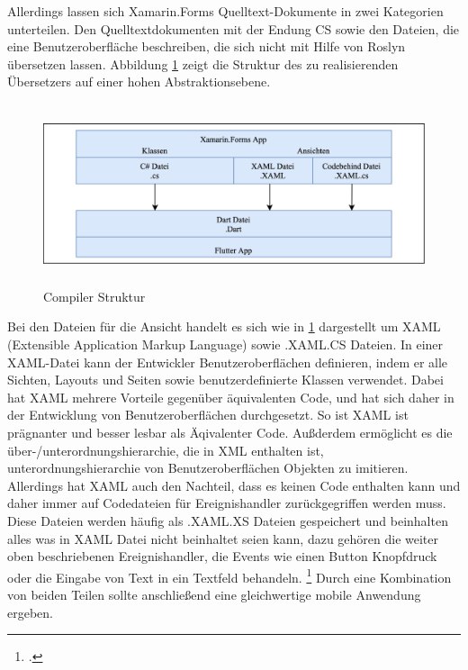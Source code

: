Allerdings lassen sich Xamarin.Forms Quelltext-Dokumente in zwei Kategorien unterteilen.  Den Quelltextdokumenten mit der Endung CS sowie den Dateien,  die eine Benutzeroberfläche beschreiben,  die sich nicht mit Hilfe von Roslyn übersetzen lassen.  Abbildung \ref{fig:CompilerStruktur} zeigt die Struktur des zu realisierenden Übersetzers auf einer hohen Abstraktionsebene.
\begin{figure}[!ht]
 \includegraphics[width=14.5cm,height=5.3cm]{Images/Compiler/CompilerArchitecture.png}
 \caption{Compiler Struktur}
 \label{fig:CompilerStruktur}
\end{figure}

Bei den Dateien für die Ansicht handelt es sich wie in \ref{fig:CompilerStruktur} dargestellt um XAML (Extensible Application Markup Language) sowie .XAML.CS Dateien.  In einer XAML-Datei kann der Entwickler Benutzeroberflächen definieren, indem er alle Sichten, Layouts und Seiten sowie benutzerdefinierte Klassen verwendet.  Dabei hat XAML mehrere Vorteile gegenüber äquivalenten Code,  und hat sich daher in der Entwicklung von Benutzeroberflächen durchgesetzt.  So ist XAML ist prägnanter und besser lesbar als Äqivalenter Code.  Außderdem ermöglicht es die über-/unterordnungshierarchie, die in XML enthalten ist,  unterordnungshierarchie von Benutzeroberflächen Objekten zu imitieren.  Allerdings hat XAML auch den Nachteil, dass es keinen Code enthalten kann und daher immer auf Codedateien für Ereignishandler zurückgegriffen werden muss.  Diese Dateien werden häufig als .XAML.XS Dateien gespeichert und beinhalten alles was in XAML Datei nicht beinhaltet seien kann,  dazu gehören die weiter oben beschriebenen Ereignishandler,  die Events wie einen Button Knopfdruck oder die Eingabe von Text in ein Textfeld behandeln. \footcite[Vgl.][Abgerufen am \today]{MicrosoftXAML2017}
Durch eine Kombination von beiden Teilen sollte anschließend eine gleichwertige mobile Anwendung ergeben. 

